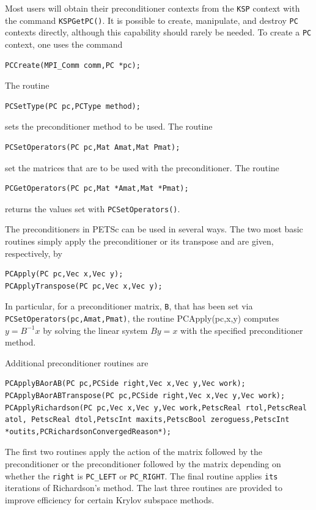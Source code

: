 {{{Most users will obtain their preconditioner contexts from the \lstinline{KSP}
context with the command \lstinline{KSPGetPC()}. It is possible to create,
manipulate, and destroy \lstinline{PC} contexts directly, although this capability
should rarely be needed. To create a \lstinline{PC} context, one uses the command
\begin{lstlisting}
PCCreate(MPI_Comm comm,PC *pc);
\end{lstlisting}
The routine
\begin{lstlisting}
PCSetType(PC pc,PCType method);
\end{lstlisting}
sets the preconditioner method to be used.
The routine
\begin{lstlisting}
PCSetOperators(PC pc,Mat Amat,Mat Pmat);
\end{lstlisting}
set the matrices that are to be used with
the preconditioner.
The routine
\begin{lstlisting}
PCGetOperators(PC pc,Mat *Amat,Mat *Pmat);
\end{lstlisting}
returns the values set with \lstinline{PCSetOperators()}.

The preconditioners in PETSc can be used in several ways.  The two
most basic routines simply apply the preconditioner or its transpose
and are given, respectively, by
\begin{lstlisting}
PCApply(PC pc,Vec x,Vec y);
PCApplyTranspose(PC pc,Vec x,Vec y);
\end{lstlisting}
In particular, for a preconditioner matrix, \lstinline{B}, that has
been set via \lstinline{PCSetOperators(pc,Amat,Pmat)},
the routine PCApply(pc,x,y) computes $y = B^{-1} x$
by solving the linear system $By = x$ with the specified preconditioner
method.

Additional preconditioner routines are
\begin{lstlisting}
PCApplyBAorAB(PC pc,PCSide right,Vec x,Vec y,Vec work);
PCApplyBAorABTranspose(PC pc,PCSide right,Vec x,Vec y,Vec work);
PCApplyRichardson(PC pc,Vec x,Vec y,Vec work,PetscReal rtol,PetscReal atol, PetscReal dtol,PetscInt maxits,PetscBool zeroguess,PetscInt *outits,PCRichardsonConvergedReason*);
\end{lstlisting}
The first two routines apply the action of the matrix followed by the
preconditioner or the preconditioner followed by the matrix depending
on whether the  \lstinline{right} is
\lstinline{PC_LEFT} or \lstinline{PC_RIGHT}. The final routine applies \lstinline{its} iterations of
Richardson's method.   
The last three routines are provided to improve
efficiency for certain Krylov subspace methods.

}}}

